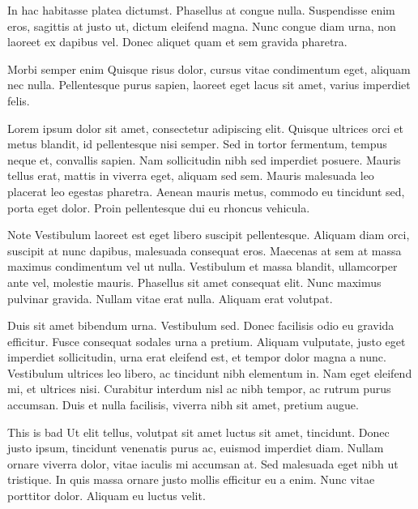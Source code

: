 \documentclass[draft]{article}
\begin{document}
In hac habitasse platea dictumst. Phasellus at congue nulla.
Suspendisse enim eros, sagittis at justo ut, dictum eleifend magna. Nunc congue
diam urna, non laoreet ex dapibus vel. Donec aliquet quam et sem gravida
pharetra. 

\begin{anfxerror}{Morbi semper enim}
  Quisque risus dolor, cursus vitae condimentum eget, aliquam nec nulla.
  Pellentesque purus sapien, laoreet eget lacus sit amet, varius imperdiet
  felis.
\end{anfxerror}

Lorem ipsum dolor sit amet, consectetur adipiscing elit. Quisque ultrices orci
et metus blandit, id pellentesque nisi semper.
Sed in tortor fermentum, tempus neque et, convallis sapien. Nam sollicitudin
nibh sed imperdiet posuere. Mauris tellus erat, mattis in viverra eget, aliquam
sed sem. Mauris malesuada leo placerat leo egestas pharetra. Aenean mauris
metus, commodo eu tincidunt sed, porta eget dolor. Proin pellentesque dui eu
rhoncus vehicula.

\begin{anfxerror*}{Note}
  {Vestibulum laoreet est eget libero suscipit pellentesque. }
  Aliquam diam orci, suscipit at nunc dapibus, malesuada consequat eros.
  Maecenas at sem at massa maximus condimentum vel ut nulla. Vestibulum et massa
  blandit, ullamcorper ante vel, molestie mauris. Phasellus sit amet consequat
  elit. Nunc maximus pulvinar gravida. Nullam vitae erat nulla. Aliquam erat
  volutpat.
\end{anfxerror*}

\begin{anfxfatal}{Duis sit amet bibendum urna. Vestibulum sed.}
  Donec facilisis odio eu gravida efficitur. Fusce consequat sodales urna a
  pretium. Aliquam vulputate, justo eget imperdiet sollicitudin, urna erat
  eleifend est, et tempor dolor magna a nunc. Vestibulum ultrices leo libero, ac
  tincidunt nibh elementum in. Nam eget eleifend mi, et ultrices nisi. Curabitur
  interdum nisl ac nibh tempor, ac rutrum purus accumsan. Duis et nulla
  facilisis, viverra nibh sit amet, pretium augue.
\end{anfxfatal}

\begin{anfxfatal*}{This is bad}
  {Ut elit tellus, volutpat sit amet luctus sit amet, tincidunt. }
  Donec justo ipsum, tincidunt venenatis purus ac, euismod imperdiet diam.
  Nullam ornare viverra dolor, vitae iaculis mi accumsan at. Sed malesuada eget
  nibh ut tristique. In quis massa ornare justo mollis efficitur eu a enim. Nunc
  vitae porttitor dolor. Aliquam eu luctus velit.
\end{anfxfatal*}
\end{document}
